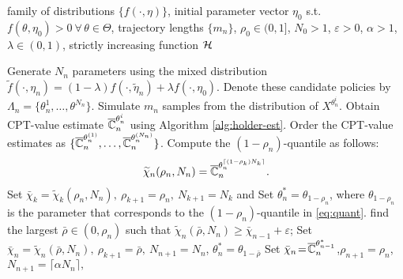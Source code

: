 \begin{algorithm}
\begin{algorithmic}
  family of distributions $\{f(\cdot,\eta)\}$, initial parameter vector $\eta_0$ s.t. $f(\theta,\eta_0)>0 ~\forall\, \theta\in \Theta$, trajectory lengths $\{m_n\}$, 
$\rho_0 \in (0,1]$, $N_0>1$,
$\varepsilon> 0$, $\alpha>1$, $\lambda \in(0,1)$,
strictly increasing function
$\mathcal{H}\hspace*{-3pt}$.

	\Candidate
	    \State 
	    Generate $N_n$ parameters using the mixed distribution $\widetilde f(\cdot,\eta_n)= (1-\lambda)f(\cdot,\widetilde\eta_n)+\lambda f(\cdot,\eta_0)$. 
	    \State Denote these candidate policies by $\Lambda_n=\{\theta^1_n, \ldots, \theta^{N_n}\}$.
	\EndCandidate    
	\Estimation
	      \State Simulate $m_n$ samples from the distribution of $X^{\theta^i_n}$.
	      \State Obtain CPT-value estimate $\overline {\mathbb{C}}_n^{\theta^i_n}$ using Algorithm \ref{alg:holder-est}.
	      \EndFor
	\EndEstimation
	\Elite
	  \State Order the CPT-value estimates as $\{\overline {\mathbb{C}}_n^{\theta^{(1)}_n},\ldots,\overline {\mathbb{C}}_n^{\theta^{(N_n)}_n}\}$. 
	  \State Compute the $(1-\rho_n)$-quantile as follows: 
	  \begin{align}
\widetilde \chi_{n}(\rho_n,N_n) = \overline {\mathbb{C}}_n^{\theta^{\lceil(1-\rho_k)N_k \rceil}_n}.\label{eq:quant}
\end{align}
	\EndElite
	\Thresholding
	    \State Set $\bar \chi_{k} = \widetilde \chi_{k}(\rho_n,N_n),~\rho_{k+1} = \rho_n,~N_{k+1} = N_{k}$ and \label{step:3a}
	    \State Set $\theta^*_{n} = \theta_{1-\rho_{n}}$, where $\theta_{1-\rho_{n}}$ is the parameter that corresponds to the $(1-\rho_n)$-quantile in \eqref{eq:quant}.
	\Else
             \State find the largest $\bar \rho \in (0, \rho_n)$ such that $\widetilde\chi_{n}(\bar \rho,N_n)\geq \bar\chi_{n-1}+\varepsilon$;             
              \State Set $\bar \chi_{n}\! =\! \widetilde \chi_{n}(\bar \rho,N_n),~ \rho_{k+1}  \!=\! \bar \rho,~N_{n+1} \!=\! N_{n}$, 
              $\theta^*_{n} \!=\! \theta_{1- \bar \rho}$ \label{step:3b} \vspace{-3ex}
              \Else
	      \State Set $\bar \chi_{n}  \!=\! \overline {\mathbb{C}}_n^{\theta^*_{n-1}}$,$\rho_{n+1} \!=\! \rho_n$,$N_{n+1} \!=\! \lceil\alpha N_{n}\rceil,$ 

\end{algorithmic}
\end{algorithm}
